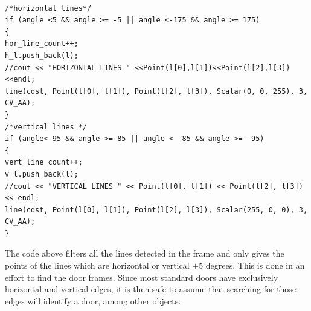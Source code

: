 \documentclass{article}
\begin{document}
\begin{lstlisting}

/*horizontal lines*/
if (angle <5 && angle >= -5 || angle <-175 && angle >= 175)
{
hor_line_count++;
h_l.push_back(l);
//cout << "HORIZONTAL LINES " <<Point(l[0],l[1])<<Point(l[2],l[3]) <<endl;
line(cdst, Point(l[0], l[1]), Point(l[2], l[3]), Scalar(0, 0, 255), 3, CV_AA);
}
/*vertical lines */
if (angle< 95 && angle >= 85 || angle < -85 && angle >= -95)
{
vert_line_count++;
v_l.push_back(l);
//cout << "VERTICAL LINES " << Point(l[0], l[1]) << Point(l[2], l[3]) << endl;
line(cdst, Point(l[0], l[1]), Point(l[2], l[3]), Scalar(255, 0, 0), 3, CV_AA);		
}

\end{lstlisting}
The code above filters all the lines detected in the frame and only gives the points of the lines which are horizontal or vertical  $\pm{5}$ degrees. This is done in an effort to find the door frames. Since most standard doors have exclusively horizontal and vertical edges, it is then safe to assume that searching for those edges will identify a door, among other objects.\\
\end{document}
